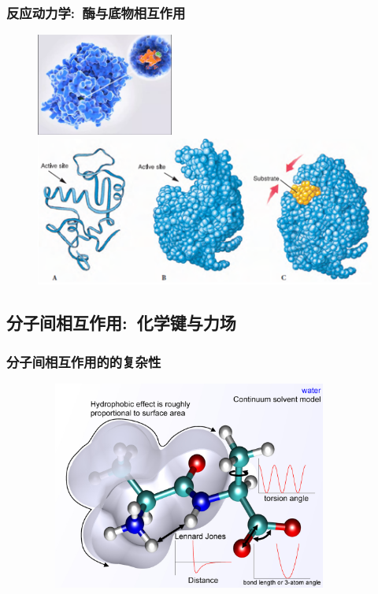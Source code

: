 %
\frame
{
	\frametitle{反应动力学:~酶与底物相互作用}
\begin{figure}[h!]
\centering
\vspace{-10.5pt}
\includegraphics[height=0.30\textwidth,width=0.4\textwidth,viewport=0 0 880 600,clip]{Figures/Active_site_model.png}
\includegraphics[height=0.37\textwidth,width=1.0\textwidth,viewport=0 0 460 200,clip]{Figures/enzyme-substrate-2.png}
\label{enzyme-substrate}
\end{figure}
}

\subsection{分子间相互作用:~化学键与力场}
\frame
{
	\frametitle{分子间相互作用的的复杂性}
\begin{figure}[h!]
\centering
\label{MO-Bond_charge-density}
\vspace{-3.5pt}
\includegraphics[height=2.70in,width=4.00in,viewport=0 0 355 260,clip]{Figures/Molecular_mechanics-potential_energy_function-with-continuum_solvent.png}
\end{figure}
}

